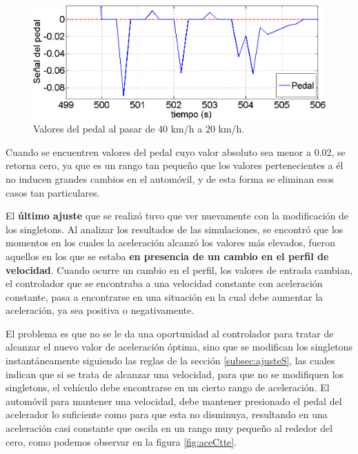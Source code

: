 \begin{figure}[h]
\centering
\includegraphics[width=0.6\linewidth,type=png,ext=.png,read=.png]{figures/pedal002}
\caption{Valores del pedal al pasar de 40 km/h a 20 km/h.}
\label{fig:pedal002}
\end{figure} 

Cuando se encuentren valores del pedal cuyo valor absoluto sea menor a 0.02, se retorna cero, ya que es un rango tan pequeño que los valores pertenecientes a él no inducen grandes cambios en el automóvil, y de esta forma se eliminan esos casos tan particulares.

El \textbf{último ajuste} que se realizó tuvo que ver nuevamente con la modificación de los singletons. Al analizar los resultados de las simulaciones, se encontró que los momentos en los cuales la aceleración alcanzó los valores más elevados, fueron aquellos en los que se estaba \textbf{en presencia de un cambio en el perfil de velocidad}. Cuando ocurre un cambio en el perfil, los valores de entrada cambian, el controlador que se encontraba a una velocidad constante con aceleración constante, pasa a encontrarse en una situación en la cual debe aumentar la aceleración, ya sea positiva o negativamente. 


El problema es que no se le da una oportunidad al controlador para tratar de alcanzar el nuevo valor de aceleración óptima, sino que se modifican los singletons instantáneamente siguiendo las reglas de la sección \ref{subsec:ajusteS}, las cuales indican que si se trata de alcanzar una velocidad, para que no se modifiquen los singletons, el vehículo  debe encontrarse en un cierto rango de aceleración. El automóvil para mantener una velocidad, debe mantener presionado el pedal del acelerador lo suficiente como para que esta no disminuya, resultando en una aceleración casi constante que oscila en un rango muy pequeño al rededor del cero, como podemos observar en la figura \ref{fig:aceCtte}. 

